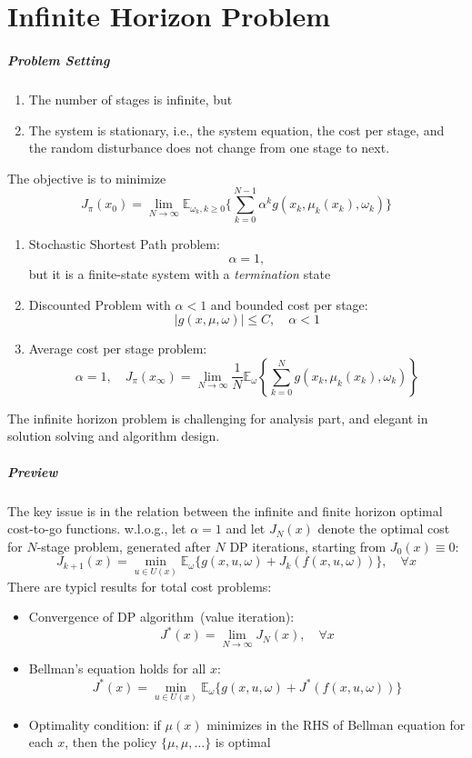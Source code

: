 
\chapter{Infinite Horizon Problem}
\paragraph{Problem Setting}
\begin{enumerate}
\item
The number of stages is infinite, but
\item
The system is stationary, i.e., the system equation, the cost per stage, and the random disturbance does not change from one stage to next.
\end{enumerate}
The objective is to minimize
\[
J_{\pi}(x_0) = \lim_{N\to\infty}\mathbb{E}_{\omega_k,k\ge0}\Bigg\{
\sum_{k=0}^{N-1}\alpha^kg(x_k,\mu_k(x_k),\omega_k)
\Bigg\}
\]

\begin{enumerate}
\item
Stochastic Shortest Path problem:
\[
\alpha=1,
\]
but it is a finite-state system with a \emph{termination} state
\item
Discounted Problem with $\alpha<1$ and bounded cost per stage:
\[
|g(x,\mu,\omega)|\le C,\quad
\alpha<1
\]
\item
Average cost per stage problem:
\[
\alpha=1,\quad
J_\pi(x_\infty) = \lim_{N\to\infty}\frac{1}{N}\mathbb{E}_\omega
\left\{
\sum_{k=0}^Ng(x_k,\mu_k(x_k),\omega_k)
\right\}
\]
\end{enumerate}
The infinite horizon problem is challenging for analysis part, and elegant in solution solving and algorithm design.

\paragraph{Preview}
The key issue is in the relation between the infinite and finite horizon optimal cost-to-go functions.
w.l.o.g., let $\alpha=1$ and let $J_N(x)$ denote the optimal cost for $N$-stage problem, generated after $N$ DP iterations, starting from $J_0(x)\equiv0$:
\[
J_{k+1}(x)=\min_{u\in U(x)}\mathbb{E}_{\omega}\{g(x,u,\omega)+J_k(f(x,u,\omega))\},\quad\forall x
\]
There are typicl results for total cost problems:
\begin{itemize}
\item
Convergence of DP algorithm~(value iteration):
\[
J^*(x) = \lim_{N\to\infty}J_N(x),\quad\forall x
\]
\item
Bellman's equation holds for all $x$:
\[
J^*(x) = \min_{u\in U(x)}\mathbb{E}_{\omega}\{g(x,u,\omega)+J^*(f(x,u,\omega))\}
\]
\item
Optimality condition: if $\mu(x)$ minimizes in the RHS of Bellman equation for each $x$, then the policy $\{\mu,\mu,\dots\}$ is optimal
\end{itemize}
